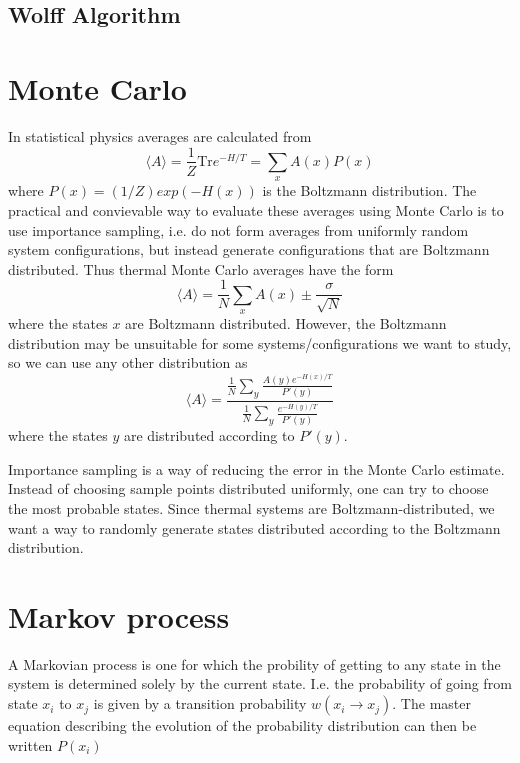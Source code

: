 \documentclass[a4paper]{article}
\newcommand{\trm}[1]{\textrm{#1}}
\begin{document}
\subsection{Wolff Algorithm}

\section{Monte Carlo}
In statistical physics averages are calculated from 
\begin{equation}
  \langle A\rangle = \frac{1}{Z}\trm{Tr} e^{-H/T} = \sum_x A(x) P(x)
  \label{}
\end{equation}
where  $P(x) = (1/Z)exp(-H(x))$ is the Boltzmann distribution.
The practical and convievable way to evaluate these averages using Monte Carlo is to use importance sampling, i.e. do not form averages from uniformly random system configurations, but instead generate configurations that are Boltzmann distributed.   
Thus thermal Monte Carlo averages have the form 
\begin{equation}
  \langle A \rangle = \frac{1}{N} \sum_x A(x) \pm \frac{\sigma	}{\sqrt N}
  \label{}
\end{equation}
where the states $x$ are Boltzmann distributed.
However, the Boltzmann distribution may be unsuitable for some systems/configurations we want to study, so we can use any other distribution as 
\begin{equation}
  \langle A \rangle = \frac{\frac{1}{N}\sum_y \frac{A(y) e^{-H(x)/T}}{P'(y)}}{\frac{1}{N}\sum_y \frac{e^{-H(y)/T}}{P'(y)}}  
  \label{}
\end{equation}
 where the states $y$ are distributed according to $P'(y)$.

 Importance sampling is a way of reducing the error in the Monte Carlo estimate. Instead of choosing sample points distributed uniformly, one can try to choose the most probable states. Since thermal systems are Boltzmann-distributed, we want a way to randomly generate states distributed according to the Boltzmann distribution.
 \section{Markov process}
 A Markovian process is one for which the probility of getting to any state in the system is determined solely by the current state. I.e. the probability of going from state $x_i$ to $x_{j}$ is given by a transition probability $w(x_i \rightarrow x_j)$. The master equation describing the evolution of the probability distribution can then be written $P(x_i )$
 
\end{document}
